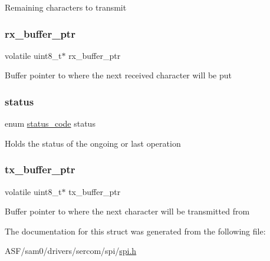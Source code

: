 Remaining characters to transmit \mbox{\label{structspi__module_a20cb7f37889a2de5bcd383a2257905f4}} 
\subsubsection{\texorpdfstring{rx\_buffer\_ptr}{rx\_buffer\_ptr}}
{\footnotesize\ttfamily volatile uint8\+\_\+t$\ast$ rx\+\_\+buffer\+\_\+ptr}

Buffer pointer to where the next received character will be put \mbox{\label{structspi__module_a30c0453c8af1896546c1ab0142be3181}} 
\subsubsection{\texorpdfstring{status}{status}}
{\footnotesize\ttfamily enum \mbox{\hyperlink{group__group__sam0__utils__status__codes_ga751c892e5a46b8e7d282085a5a5bf151}{status\+\_\+code}} status}

Holds the status of the ongoing or last operation \mbox{\label{structspi__module_ad4f5e977169e703291bab5e3483ff5dd}} 
\subsubsection{\texorpdfstring{tx\_buffer\_ptr}{tx\_buffer\_ptr}}
{\footnotesize\ttfamily volatile uint8\+\_\+t$\ast$ tx\+\_\+buffer\+\_\+ptr}

Buffer pointer to where the next character will be transmitted from 

The documentation for this struct was generated from the following file\+:\begin{DoxyCompactItemize}
\item 
A\+S\+F/sam0/drivers/sercom/spi/\mbox{\hyperlink{spi_8h}{spi.\+h}}\end{DoxyCompactItemize}
